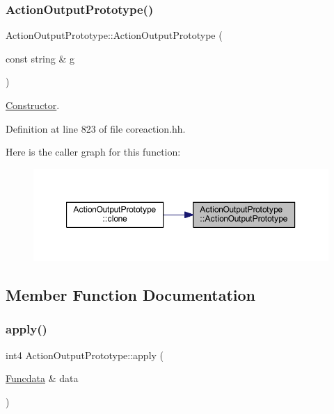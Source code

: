 \subsubsection{\texorpdfstring{ActionOutputPrototype()}{ActionOutputPrototype()}}
{\footnotesize\ttfamily Action\+Output\+Prototype\+::\+Action\+Output\+Prototype (\begin{DoxyParamCaption}\item[{const string \&}]{g }\end{DoxyParamCaption})\hspace{0.3cm}{\ttfamily [inline]}}



\mbox{\hyperlink{class_constructor}{Constructor}}. 



Definition at line 823 of file coreaction.\+hh.

Here is the caller graph for this function\+:
\nopagebreak
\begin{figure}[H]
\begin{center}
\leavevmode
\includegraphics[width=350pt]{class_action_output_prototype_acb678135a6a44a1f341b74fc8033cbbb_icgraph}
\end{center}
\end{figure}


\subsection{Member Function Documentation}
\mbox{\label{class_action_output_prototype_a1ed1275253a29c1d09d2383c00e34a9c}} 
\subsubsection{\texorpdfstring{apply()}{apply()}}
{\footnotesize\ttfamily int4 Action\+Output\+Prototype\+::apply (\begin{DoxyParamCaption}\item[{\mbox{\hyperlink{class_funcdata}{Funcdata}} \&}]{data }\end{DoxyParamCaption})\hspace{0.3cm}{\ttfamily [virtual]}}



